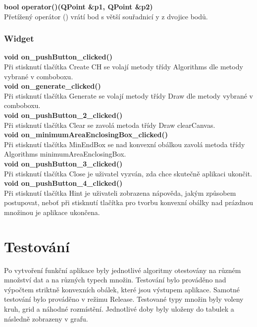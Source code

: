\documentclass[a4paper, 12pt]{article}
\begin{document}
\textbf{bool operator()(QPoint \&p1, QPoint \&p2)}\\
Přetížený operátor () vrátí bod s větší souřadnicí y z dvojice bodů.
\\

\subsubsection{Widget}


\textbf{void on\_pushButton\_clicked()}\\
Při stisknutí tlačítka Create CH se volají metody třídy Algorithms dle metody vybrané v comboboxu.
\\

\textbf{void on\_generate\_clicked()}\\
Při stisknutí tlačítka Generate se volají metody třídy Draw dle metody vybrané v comboboxu.
\\

\textbf{void on\_pushButton\_2\_clicked()}\\
Při stisknutí tlačítka Clear se zavolá metoda třídy Draw clearCanvas.
\\

\textbf{void on\_minimumAreaEnclosingBox\_clicked()}\\
Při stisknutí tlačítka MinEndBox se nad konvexní obálkou zavolá metoda třídy Algorithms minimumAreaEnclosingBox.
\\

\textbf{void on\_pushButton\_3\_clicked()}\\
Při stisknutí tlačítka Close je uživatel vyzván, zda chce skutečně aplikaci ukončit.
\\

\textbf{void on\_pushButton\_4\_clicked()}\\
Při stisknutí tlačítka Hint je uživateli zobrazena nápověda, jakým způsobem postupovat, neboť při stisknutí tlačítka pro tvorbu konvexní obálky nad prázdnou množinou je aplikace ukončena.
\\


\section{Testování}
Po vytvoření funkční aplikace byly jednotlivé algoritmy otestovány na různém množství dat a na různých typech množin. Testování bylo prováděno nad výpočtem striktně konvexních obálek, které jsou výstupem aplikace. Samotné testování bylo prováděno v režimu Release. Testované typy množin byly voleny kruh, grid a náhodné rozmístění. Jednotlivé doby byly uloženy do tabulek a následně zobrazeny v grafu. 
\end{document}
